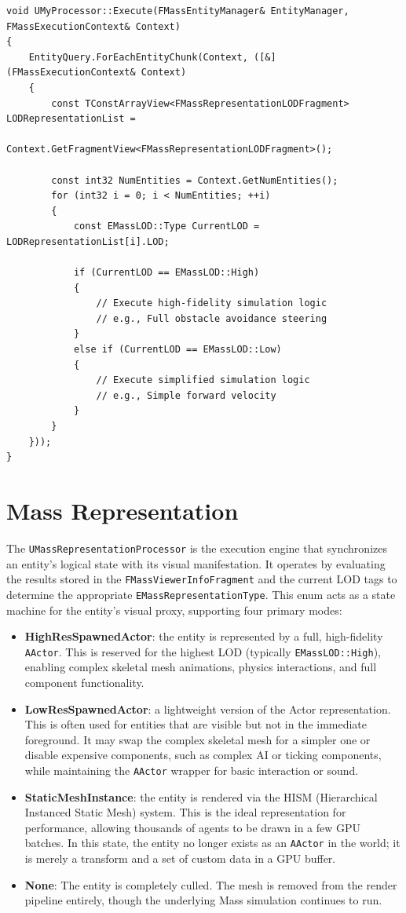 \begin{lstlisting}
void UMyProcessor::Execute(FMassEntityManager& EntityManager, FMassExecutionContext& Context)   
{
    EntityQuery.ForEachEntityChunk(Context, ([&](FMassExecutionContext& Context)
    {
        const TConstArrayView<FMassRepresentationLODFragment> LODRepresentationList = 
                    Context.GetFragmentView<FMassRepresentationLODFragment>();
        
        const int32 NumEntities = Context.GetNumEntities();
        for (int32 i = 0; i < NumEntities; ++i)
        {
            const EMassLOD::Type CurrentLOD = LODRepresentationList[i].LOD;

            if (CurrentLOD == EMassLOD::High)
            {
                // Execute high-fidelity simulation logic
                // e.g., Full obstacle avoidance steering
            }
            else if (CurrentLOD == EMassLOD::Low)
            {
                // Execute simplified simulation logic
                // e.g., Simple forward velocity
            }
        }
    }));
}
\end{lstlisting}

\section{Mass Representation}

The \texttt{UMassRepresentationProcessor} is the execution engine that synchronizes an entity’s logical state with its visual manifestation. It operates by evaluating the results stored in the \texttt{FMassViewerInfoFragment} and the current LOD tags to determine the appropriate \texttt{EMassRepresentationType}. This enum acts as a state machine for the entity's visual proxy, supporting four primary modes:

\begin{itemize}
    \item \textbf{HighResSpawnedActor}: the entity is represented by a full, high-fidelity \texttt{AActor}. This is reserved for the highest LOD (typically \texttt{EMassLOD::High}), enabling complex skeletal mesh animations, physics interactions, and full component functionality.
    \item \textbf{LowResSpawnedActor}: a lightweight version of the Actor representation. This is often used for entities that are visible but not in the immediate foreground. It may swap the complex skeletal mesh for a simpler one or disable expensive components, such as complex AI or ticking components, while maintaining the \texttt{AActor} wrapper for basic interaction or sound.
    \item \textbf{StaticMeshInstance}: the entity is rendered via the HISM (Hierarchical Instanced Static Mesh) system. This is the ideal representation for performance, allowing thousands of agents to be drawn in a few GPU batches. In this state, the entity no longer exists as an \texttt{AActor} in the world; it is merely a transform and a set of custom data in a GPU buffer.
    \item \textbf{None}: The entity is completely culled. The mesh is removed from the render pipeline entirely, though the underlying Mass simulation continues to run.
\end{itemize}

